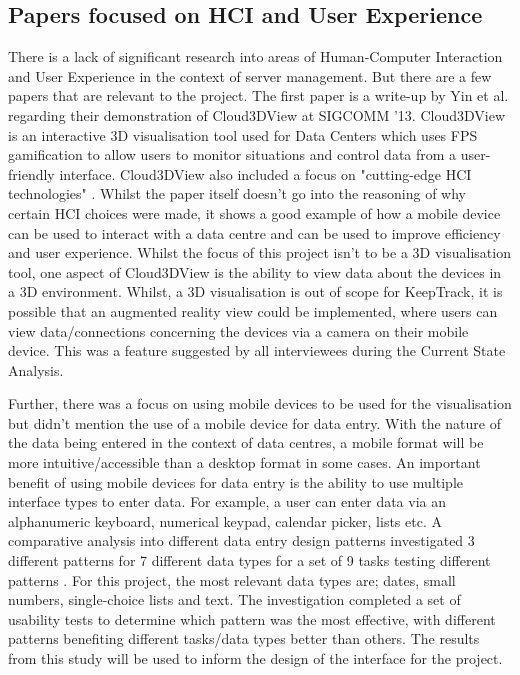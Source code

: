 \documentclass [11pt,a4paper]{article}
\begin{document}
\subsection{Papers focused on HCI and User Experience}
\label{sec:HCI}
There is a lack of significant research into areas of Human-Computer Interaction and User Experience in the context of server management. But there are a few papers that are relevant to the project. The first paper is a write-up by Yin et al. \cite{cloud3dview} regarding their demonstration of Cloud3DView at SIGCOMM '13. Cloud3DView is an interactive 3D visualisation tool used for Data Centers which uses FPS gamification to allow users to monitor situations and control data from a user-friendly interface. Cloud3DView also included a focus on "cutting-edge HCI technologies" \cite{cloud3dview}. Whilst the paper itself doesn't go into the reasoning of why certain HCI choices were made, it shows a good example of how a mobile device can be used to interact with a data centre and can be used to improve efficiency and user experience. Whilst the focus of this project isn't to be a 3D visualisation tool, one aspect of Cloud3DView is the ability to view data about the devices in a 3D environment. Whilst, a 3D visualisation is out of scope for KeepTrack, it is possible that an augmented reality view could be implemented, where users can view data/connections concerning the devices via a camera on their mobile device. This was a feature suggested by all interviewees during the Current State Analysis.

Further, there was a focus on using mobile devices to be used for the visualisation but didn't mention the use of a mobile device for data entry. With the nature of the data being entered in the context of data centres, a mobile format will be more intuitive/accessible than a desktop format in some cases. An important benefit of using mobile devices for data entry is the ability to use multiple interface types to enter data. For example, a user can enter data via an alphanumeric keyboard, numerical keypad, calendar picker, lists etc. A comparative analysis into different data entry design patterns investigated 3 different patterns for 7 different data types for a set of 9 tasks testing different patterns \cite{myka2019comparative}. For this project, the most relevant data types are; dates, small numbers, single-choice lists and text. The investigation completed a set of usability tests to determine which pattern was the most effective, with different patterns benefiting different tasks/data types better than others. The results from this study will be used to inform the design of the interface for the project.
\end{document}
